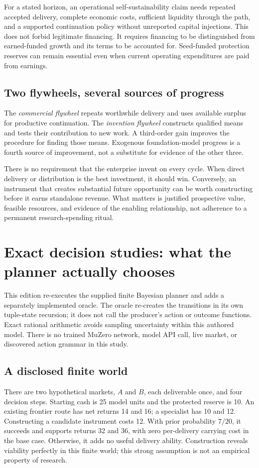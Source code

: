 \documentclass[11pt,letterpaper]{article}
\theoremstyle{remark}\newtheorem{remark}{Remark}[section]
\begin{document}
For a stated horizon, an operational self-sustainability claim needs repeated accepted delivery, complete economic costs, sufficient liquidity through the path, and a supported continuation policy without unreported capital injections. This does not forbid legitimate financing. It requires financing to be distinguished from earned-funded growth and its terms to be accounted for. Seed-funded protection reserves can remain essential even when current operating expenditures are paid from earnings.

\subsection{Two flywheels, several sources of progress}
The \emph{commercial flywheel} repeats worthwhile delivery and uses available surplus for productive continuation. The \emph{invention flywheel} constructs qualified means and tests their contribution to new work. A third-order gain improves the procedure for finding those means. Exogenous foundation-model progress is a fourth source of improvement, not a substitute for evidence of the other three.

There is no requirement that the enterprise invent on every cycle. When direct delivery or distribution is the best investment, it should win. Conversely, an instrument that creates substantial future opportunity can be worth constructing before it earns standalone revenue. What matters is justified prospective value, feasible resources, and evidence of the enabling relationship, not adherence to a permanent research-spending ritual.

\section{Exact decision studies: what the planner actually chooses}\label{sec:experiments}
This edition re-executes the supplied finite Bayesian planner \citep{decision001} and adds a separately implemented oracle. The oracle re-creates the transitions in its own tuple-state recursion; it does not call the producer's action or outcome functions. Exact rational arithmetic avoids sampling uncertainty within this authored model. There is no trained MuZero network, model API call, live market, or discovered action grammar in this study.

\subsection{A disclosed finite world}
There are two hypothetical markets, $A$ and $B$, each deliverable once, and four decision steps. Starting cash is 25 model units and the protected reserve is 10. An existing frontier route has net returns 14 and 16; a specialist has 10 and 12. Constructing a candidate instrument costs 12. With prior probability $7/20$, it succeeds and supports returns 32 and 36, with zero per-delivery carrying cost in the base case. Otherwise, it adds no useful delivery ability. Construction reveals viability perfectly in this finite world; this strong assumption is not an empirical property of research.
\end{document}
